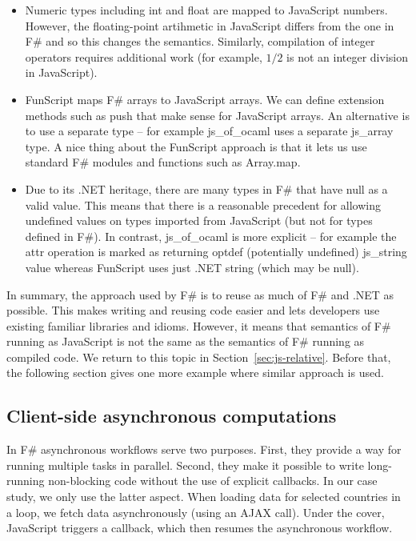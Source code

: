 \documentclass[submission,copyright,creativecommons]{eptcs}
\newcommand{\kvd}[1]{\textnormal{\textcolor{kvdclr}{\sffamily #1}}}
\newcommand{\ident}[1]{\textnormal{\sffamily #1}}
\begin{document}
\begin{itemize}
\item Numeric types including \ident{int} and \ident{float} are mapped to JavaScript numbers.
  However, the floating-point artihmetic in JavaScript differs from the one in F\# and so this changes 
  the semantics. Similarly, compilation of integer operators requires additional work (for 
  example, $1/2$ is not an integer division in JavaScript).

\item FunScript maps F\# arrays to JavaScript arrays. We can define extension methods
  such as \ident{push} that make sense for JavaScript arrays. An alternative is to use a 
  separate type -- for example js\_of\_ocaml uses a separate \ident{js\_array} type.
  A nice thing about the FunScript approach is that it lets us use standard F\# modules
  and functions such as \ident{Array.map}.

\item Due to its .NET heritage, there are many types in F\# that have \kvd{null} as a valid
  value. This means that there is a reasonable precedent for allowing \kvd{undefined} values
  on types imported from JavaScript (but not for types defined in F\#). In contrast,
  js\_of\_ocaml is more explicit -- for example the \ident{attr} operation is marked as 
  returning \ident{optdef} (potentially undefined) \ident{js\_string} value whereas FunScript
  uses just .NET \ident{string} (which may be \kvd{null}).
\end{itemize}

\noindent
In summary, the approach used by F\# is to reuse as much of F\# and .NET as possible. This
makes writing and reusing code easier and lets developers use existing familiar libraries and
idioms. However, it means that semantics of F\# running as JavaScript is not the same as the
semantics of F\# running as compiled code. We return to this topic in Section~\ref{sec:js-relative}. 
Before that, the following section gives one more example where similar approach is used.

\subsection{Client-side asynchronous computations}
\label{sec:js-async}

In F\# asynchronous workflows \cite{fsharp-async} serve two purposes. First, they provide a
way for running multiple tasks in parallel. Second, they make it possible to write long-running
non-blocking code without the use of explicit callbacks. In our case study, we only use the 
latter aspect. When loading data for selected countries in a loop, we fetch data asynchronously 
(using an AJAX call). Under the cover, JavaScript triggers a callback, which then resumes the 
asynchronous workflow. 
\end{document}
